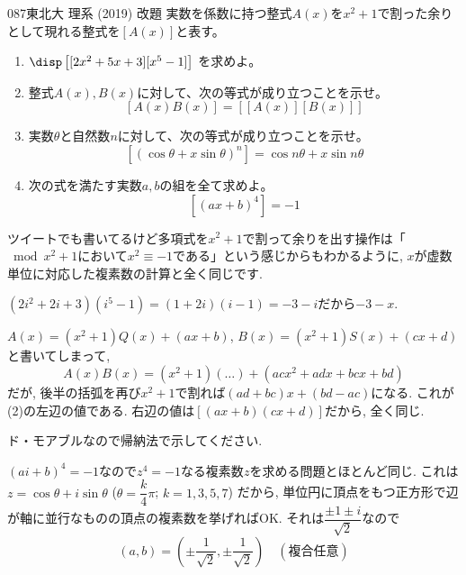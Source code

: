 \begin{prob}{087}{}{東北大 理系 (2019) 改題}
 実数を係数に持つ整式$A(x)$を$x^2+1$で割った余りとして現れる整式を$\left[A(x)\right]$と表す。
 \begin{enumerate}
  \item $\disp \left[ [2x^2+5x+3] [x^5-1] \right]$ を求めよ。
  \item 整式$A(x), B(x)$に対して、次の等式が成り立つことを示せ。
	\[ [A(x) B(x)]=\left[ [A(x)] [B(x)]\right] \]
  \item 実数$\theta$と自然数$n$に対して、次の等式が成り立つことを示せ。
	\[ \left[ (\cos\theta+x\sin\theta)^n \right] = \cos n\theta + x\sin n\theta \]
  \item 次の式を満たす実数$a, b$の組を全て求めよ。
	\[ \left[ (ax+b)^4 \right] = -1 \]
 \end{enumerate}
\end{prob}
ツイートでも書いてるけど多項式を$x^2+1$で割って余りを出す操作は「$\bmod{x^2+1}$において$x^2 \equiv -1$である」という感じからもわかるように, $x$が虚数単位に対応した複素数の計算と全く同じです. 

$(2i^2 + 2i + 3) (i^5 - 1) = (1 + 2i)(i-1) = -3 - i$だから$-3-x$. 

$A(x) = (x^2+1)Q(x)  + (ax + b)$, $B(x) = (x^2 + 1)S(x) + (cx+d)$と書いてしまって, 
\[A(x)B(x) = (x^2+1)(\dots) + (acx^2 + adx + bcx + bd) \]
だが, 後半の括弧を再び$x^2+1$で割れば$(ad + bc)x + (bd-ac)$になる. これが(2)の左辺の値である. 右辺の値は$[(ax+b)(cx+d)]$だから, 全く同じ. 

ド・モアブルなので帰納法で示してください. 

$(ai + b)^4 = - 1$なので$z^4 = -1$なる複素数$z$を求める問題とほとんど同じ. これは$z= \cos{\theta} + i\sin{\theta}$ ($\theta = \dfrac{k}{4}\pi $; $k=1,3,5,7$) だから, 単位円に頂点をもつ正方形で辺が軸に並行なものの頂点の複素数を挙げればOK. それは$\dfrac{\pm 1 \pm i}{\sqrt{2}}$なので
\[(a,b) = (\pm\dfrac{1}{\sqrt{2}},\pm\dfrac{1}{\sqrt{2}})\quad (複合任意)\]